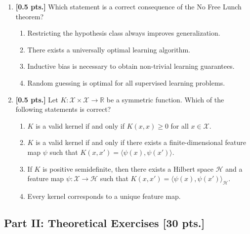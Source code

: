 \documentclass[11pt,a4paper]{article}
\begin{document}
\begin{enumerate}[label=\textbf{MQ\arabic*.}]
    \item \textbf{[0.5 pts.]} Which statement is a correct consequence of the No Free Lunch theorem?
    \begin{enumerate}[label=(\alph*)]
        \item Restricting the hypothesis class always improves generalization.
        \item There exists a universally optimal learning algorithm.
        \item Inductive bias is necessary to obtain non-trivial learning guarantees.
        \item Random guessing is optimal for all supervised learning problems.
    \end{enumerate}

    \item \textbf{[0.5 pts.]} Let $K : \mathcal{X} \times \mathcal{X} \to \mathbb{R}$ be a symmetric function. Which of the following statements is correct?
    \begin{enumerate}[label=(\alph*)]
        \item $K$ is a valid kernel if and only if $K(x, x) \ge 0$ for all $x \in \mathcal{X}$.
        \item $K$ is a valid kernel if and only if there exists a finite-dimensional feature map $\psi$ such that $K(x, x') = \langle \psi(x), \psi(x') \rangle$.
        \item If $K$ is positive semidefinite, then there exists a Hilbert space $\mathcal{H}$ and a feature map $\psi : \mathcal{X} \to \mathcal{H}$ such that $K(x, x') = \langle \psi(x), \psi(x') \rangle_{\mathcal{H}}$.
        \item Every kernel corresponds to a unique feature map.
    \end{enumerate}
\end{enumerate}

\subsection*{Part II: Theoretical Exercises [30 pts.]}
\end{document}
